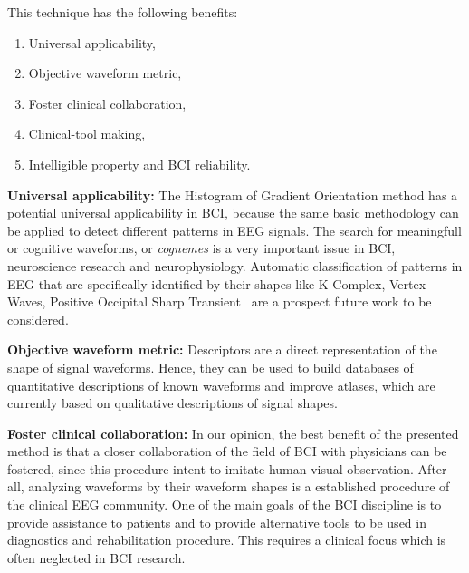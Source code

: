 

\vspace{5pt}

This technique has the following benefits:

\begin{enumerate}
\item Universal applicability,
\item Objective waveform metric,
\item Foster clinical collaboration,
\item Clinical-tool making,
\item Intelligible property and BCI reliability.
\end{enumerate}

\textbf{Universal applicability:}
The Histogram of Gradient Orientation method has a potential universal applicability in BCI, because the same basic methodology can be applied to detect different patterns in EEG signals.   The search for meaningfull or cognitive waveforms, or \textit{cognemes} is a very important issue in BCI, neuroscience research and neurophysiology. Automatic classification of patterns in EEG that are specifically identified by their shapes like K-Complex, Vertex Waves, Positive Occipital Sharp Transient~\cite{Hartman2005} are a prospect future work to be considered. 


\textbf{Objective waveform metric:}
Descriptors are a direct representation of the shape of signal waveforms. Hence,  they can be used to build databases of quantitative descriptions of known waveforms and improve atlases, which are currently based on qualitative descriptions of signal shapes.

\textbf{Foster clinical collaboration:}
In our opinion, the best benefit of the presented method is that a closer collaboration of the field of BCI with physicians can be fostered, since this procedure intent to imitate human visual observation. After all, analyzing waveforms by their waveform shapes is a established procedure of the clinical EEG community. One of the main goals of the BCI discipline is to provide assistance to patients and to provide alternative tools to be used in diagnostics and rehabilitation procedure.  This requires a clinical focus which is often neglected in BCI research. 

